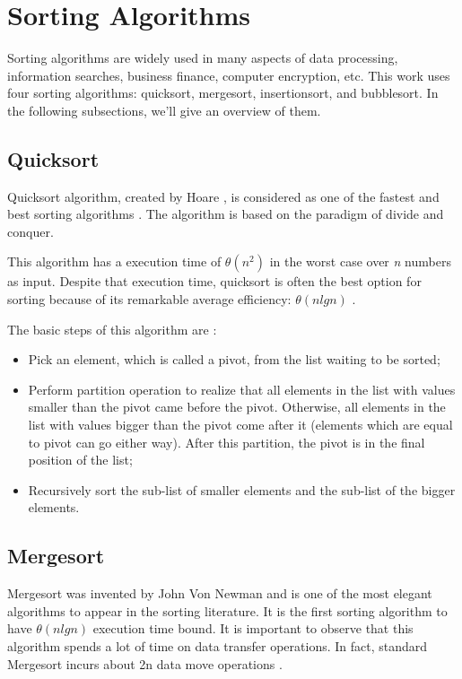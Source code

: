 \section{Sorting Algorithms}

Sorting algorithms are widely used in many aspects of data processing, information searches, business finance, computer encryption, etc. This work uses four sorting algorithms: quicksort, mergesort, insertionsort, and bubblesort. In the following subsections, we'll give an overview of them.

\subsection{Quicksort}

Quicksort algorithm, created by Hoare \cite{Hoare1962}, is considered as one of the fastest and best sorting algorithms \cite{Wang2011}. The algorithm is based on the paradigm of divide and conquer.

This algorithm has a execution time of $\theta(n^2)$ in the worst case over \textit{n} numbers as input. Despite that execution time, quicksort is often the best option for sorting because of its remarkable average efficiency: $\theta(n lg n)$ \cite{Cormen2009}.

The basic steps of this algorithm are \cite{Wang2011}:
\begin{itemize}
    \item Pick an element, which is called a pivot, from the list waiting to be sorted;
    \item Perform partition operation to realize that all elements in the list with values smaller than the pivot came before the pivot. Otherwise, all elements in the list with values bigger than the pivot come after it (elements which are equal to pivot can go either way). After this partition, the pivot is in the final position of the list;
    \item Recursively sort the sub-list of smaller elements and the sub-list of the bigger elements.
\end{itemize}

\subsection{Mergesort}

Mergesort was invented by John Von Newman and is one of the most elegant algorithms to appear in the sorting literature. It is the first sorting algorithm to have $\theta(n lg n)$ execution time bound. It is important to observe that this algorithm spends a lot of time on data transfer operations. In fact, standard Mergesort incurs about 2n data move operations \cite{Abhyankar2011}.

